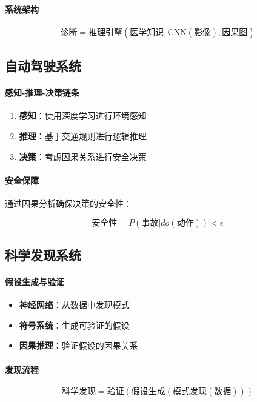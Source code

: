 \paragraph{系统架构}
$$\text{诊断} = \text{推理引擎}(\text{医学知识}, \text{CNN}(\text{影像}), \text{因果图})$$

\subsection{自动驾驶系统}

\paragraph{感知-推理-决策链条}
\begin{enumerate}
\item \textbf{感知}：使用深度学习进行环境感知
\item \textbf{推理}：基于交通规则进行逻辑推理
\item \textbf{决策}：考虑因果关系进行安全决策
\end{enumerate}

\paragraph{安全保障}
通过因果分析确保决策的安全性：

$$\text{安全性} = P(\text{事故}|do(\text{动作})) < \epsilon$$

\subsection{科学发现系统}

\paragraph{假设生成与验证}
\begin{itemize}
\item \textbf{神经网络}：从数据中发现模式
\item \textbf{符号系统}：生成可验证的假设
\item \textbf{因果推理}：验证假设的因果关系
\end{itemize}

\paragraph{发现流程}
$$\text{科学发现} = \text{验证}(\text{假设生成}(\text{模式发现}(\text{数据})))$$

